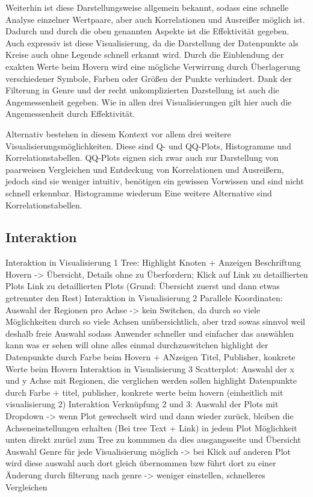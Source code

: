 \documentclass[usegeometry=true]{scrartcl}
\begin{document}
Weiterhin ist diese Darstellungsweise allgemein bekannt, sodass eine schnelle Analyse einzelner Wertpaare, aber auch Korrelationen und Ausreißer möglich ist. 
Dadurch und durch die oben genannten Aspekte ist die Effektivität gegeben. 
Auch expressiv ist diese Visualisierung, da die Darstellung der Datenpunkte als Kreise auch ohne Legende schnell erkannt wird. 
Durch die Einblendung der exakten Werte beim Hovern wird eine mögliche Verwirrung durch Überlagerung verschiedener Symbole, Farben oder Größen der Punkte verhindert. 
Dank der Filterung in Genre und der recht unkomplizierten Darstellung ist auch die Angemessenheit gegeben. 
Wie in allen drei Visualisierungen gilt hier auch die Angemessenheit durch Effektivität. 

Alternativ bestehen in diesem Kontext vor allem drei weitere Visualisierungsmöglichkeiten. 
Diese sind Q- und QQ-Plots, Histogramme und Korrelationstabellen. 
QQ-Plots eignen sich zwar auch zur Darstellung von paarweisen Vergleichen und Entdeckung von Korrelationen und Ausreißern, jedoch sind sie weniger intuitiv, benötigen ein gewissen Vorwissen und sind nicht schnell erkennbar.
Histogramme wiederum 
Eine weitere Alternative sind Korrelationstabellen. 

\subsection{Interaktion}
Interaktion in Visualisierung 1 Tree: Highlight Knoten + Anzeigen Beschriftung Hovern -> Übersicht, Details ohne zu Überfordern; Klick auf Link zu detaillierten Plots
                                        Link zu detaillierten Plots (Grund: Übersicht zuerst und dann etwas getrennter den Rest)
Interaktion in Visualisierung 2 Parallele Koordinaten: Auswahl der Regionen pro Achse -> kein Switchen, da durch so viele Möglichkeiten durch so viele Achsen unübersichtlich, aber trzd sowas sinnvol weil %
                                                        deshalb freie Auswahl sodass Anwender schneller und einfacher das auswählen kann was er sehen will ohne alles einmal durchzuswitchen
                                                        highlight der Datenpunkte durch Farbe beim Hovern + ANzeigen Titel, Publisher, konkrete Werte beim Hovern
Interaktion in Visualisierung 3 Scatterplot: Auswahl der x und y Achse mit Regionen, die verglichen werden sollen
                                            highlight Datenpunkte durch Farbe + titel, publisher, konkrete werte beim hovern (einheitlich mit visualisierung 2)
Interaktion Verknüpfung 2 und 3: Auswahl der Plots mit Dropdown -> wenn Plot gewechselt wird und dann wieder zurück, bleiben die Achseneinstellungen erhalten (Bei tree Text + Link)
                                in jedem Plot Möglichkeit unten direkt zurücl zum Tree zu kommmen da dies ausgangsseite und Übersicht
                                Auswahl Genre für jede Visualisierung möglich -> bei Klick auf anderen Plot wird diese auswahl auch dort gleich übernommen bzw führt dort zu einer Änderung durch filterung nach genre -> weniger einstellen, schnelleres Vergleichen
\end{document}
